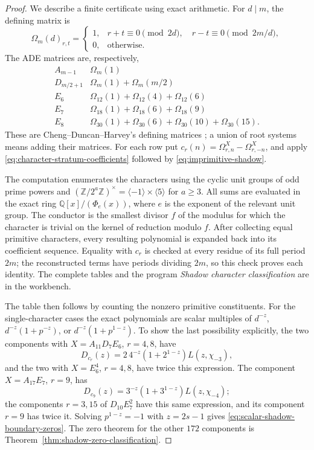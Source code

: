\begin{proof}
We describe a finite certificate using exact arithmetic.  For $d\mid m$,
the defining matrix is
\[
 \Omega_m(d)_{r,t}=\begin{cases}
 1,&r+t\equiv0\pmod{2d},\quad r-t\equiv0\pmod{2m/d},\\
 0,&\text{otherwise}.
 \end{cases}
\]
The ADE matrices are, respectively,
\[
 \begin{array}{c|c}
 A_{m-1}&\Omega_m(1)\\
 D_{m/2+1}&\Omega_m(1)+\Omega_m(m/2)\\
 E_6&\Omega_{12}(1)+\Omega_{12}(4)+\Omega_{12}(6)\\
 E_7&\Omega_{18}(1)+\Omega_{18}(6)+\Omega_{18}(9)\\
 E_8&\Omega_{30}(1)+\Omega_{30}(6)+\Omega_{30}(10)+\Omega_{30}(15).
 \end{array}
\]
These are Cheng--Duncan--Harvey's defining matrices
\cite[Table~5 and Sect.~3.3]{CDH2014}; a union of root systems means
adding their matrices.  For each row put
$c_r(n)=\Omega^X_{r,n}-\Omega^X_{r,-n}$, and apply
\eqref{eq:character-stratum-coefficients} followed by
\eqref{eq:imprimitive-shadow}.

The computation enumerates the characters using the cyclic unit groups of
odd prime powers and
$(\mathbb Z/2^a\mathbb Z)^\times=\langle-1\rangle\times\langle5\rangle$
for $a\geq3$.  All sums are evaluated in the exact ring
$\mathbb Q[x]/(\Phi_e(x))$, where $e$ is the exponent of the relevant unit
group.  The conductor is the smallest divisor $f$ of the modulus for which
the character is trivial on the kernel of reduction modulo $f$.
After collecting equal primitive characters, every resulting polynomial
is expanded back into its coefficient sequence.  Equality with $c_r$ is
checked at every residue of its full period $2m$; the reconstructed terms
have periods dividing $2m$, so this check proves each identity.
The complete tables and the program \emph{Shadow character classification}
are in the workbench.

The table then follows by counting the nonzero primitive constituents.
For the single-character cases the exact polynomials are scalar multiples
of $d^{-z}$, $d^{-z}(1+p^{-z})$, or $d^{-z}(1+p^{1-z})$.
To show the last possibility explicitly, the two components with
$X=A_{11}D_7E_6$, $r=4,8$, have
\[
 D_{c_r}(z)=2\,4^{-z}(1+2^{1-z})L(z,\chi_{-3}),
\]
and the two with $X=E_6^4$, $r=4,8$, have twice this expression.
The component $X=A_{17}E_7$, $r=9$, has
\[
 D_{c_9}(z)=3^{-z}(1+3^{1-z})L(z,\chi_{-4});
\]
the components $r=3,15$ of $D_{10}E_7^2$ have this same expression,
and its component $r=9$ has twice it.  Solving $p^{1-z}=-1$ with
$z=2s-1$ gives \eqref{eq:scalar-shadow-boundary-zeros}.
The zero theorem for the other $172$ components is
Theorem~\ref{thm:shadow-zero-classification}.
\end{proof}
